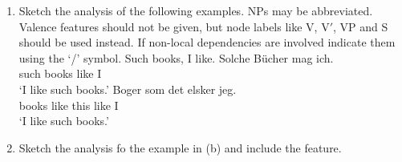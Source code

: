 {\begin{enumerate}
\eal
\ex
\gll Arbejder Bjarne ihærdigt  på bogen?\\
     works    Bjarne seriously at book.\textsc{def}\\\danish
\glt `Does Bjarne work seriously on the book?'
\ex
\gll Arbeitet Bjarne ernsthaft an dem Buch?\\
     works    Bjarne seriously at the book\\\german
\glt `Does Bjarne work seriously on the book?'
\zl

\item Sketch the analysis of the following examples. NPs may be abbreviated. Valence features should
  not be given, but node labels like V, V$'$, VP and S should be used instead. If non-local
  dependencies are involved indicate them using the `/' symbol.
\eal
\ex Such books, I like.
\ex 
\gll Solche Bücher mag ich.\\
     such   books  like I\\\german
\glt `I like such books.'
\ex
\gll Boger som det elsker jeg.\\
     books like this like I\\\danish
\glt `I like such books.'
\zl

\item Sketch the analysis fo the example in (b) and include the \comps feature.

\end{enumerate}

}



